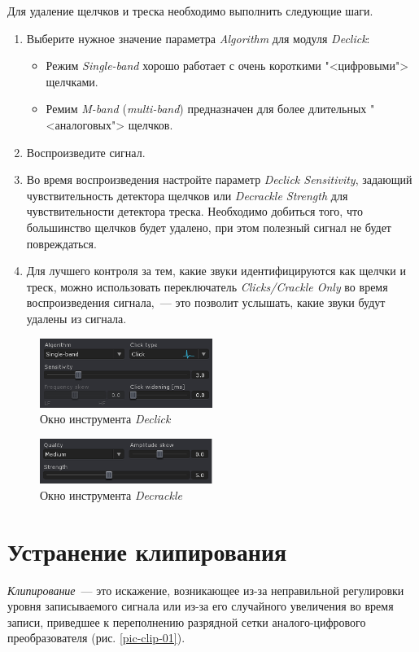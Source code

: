 \documentclass[oneside, final, 14pt]{extreport}
\begin{document}
Для удаление щелчков и треска необходимо выполнить следующие шаги.
\begin{enumerate}
  \item Выберите нужное значение параметра \emph{Algorithm} для модуля \emph{Declick}:
  \begin{itemize}
    \item Режим \emph{Single-band} хорошо работает с очень короткими "<цифровыми"> щелчками.
    \item Ремим \emph{M-band} (\emph{multi-band}) предназначен для более длительных "<аналоговых"> щелчков.
  \end{itemize}
  \item Воспроизведите сигнал.
  \item Во время воспроизведения настройте параметр \emph{Declick Sensitivity}, задающий чувствительность детектора щелчков или \emph{Decrackle Strength} для чувствительности детектора треска. Необходимо добиться того, что большинство щелчков будет удалено, при этом полезный сигнал не будет повреждаться.
  \item Для лучшего контроля за тем, какие звуки идентифицируются как щелчки и треск, можно использовать переключатель \emph{Clicks/Crackle Only} во время воспроизведения сигнала,~--- это позволит  услышать, какие звуки будут удалены из сигнала.
\end{enumerate}

\begin{figure}[h]
\centering
\includegraphics[width=0.5\textwidth]{pic-rx3declick-03}
\caption{Окно инструмента \emph{Declick}}
\label{pic-rx3declick-03}
\end{figure}

\begin{figure}[h]
\centering
\includegraphics[width=0.5\textwidth]{pic-rx3decrackle-01}
\caption{Окно инструмента \emph{Decrackle}}
\label{pic-rx3decrackle-01}
\end{figure}

\section{Устранение клипирования}
\textit{Клипирование}~--- это искажение, возникающее из-за неправильной регулировки уровня записываемого сигнала или из-за его случайного увеличения во время записи, приведшее к переполнению разрядной сетки аналого-цифрового преобразователя (рис. \ref{pic-clip-01}).
\end{document}
